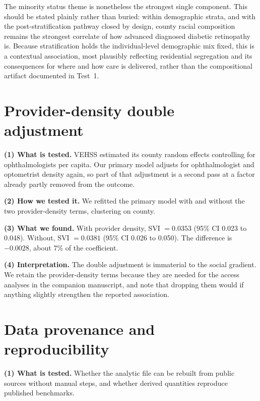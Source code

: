 \documentclass[11pt]{article}
\newcommand{\tpart}[1]{\medskip\noindent\textbf{#1}\quad}
\begin{document}
The minority status theme is nonetheless the strongest single component. This
should be stated plainly rather than buried: within demographic strata, and with
the post-stratification pathway closed by design, county racial composition
remains the strongest correlate of how advanced diagnosed diabetic retinopathy
is. Because stratification holds the individual-level demographic mix fixed,
this is a contextual association, most plausibly reflecting residential
segregation and its consequences for where and how care is delivered, rather
than the compositional artifact documented in Test~1.

\section{Provider-density double adjustment}

\tpart{(1) What is tested.} VEHSS estimated its county random effects
controlling for ophthalmologists per capita. Our primary model adjusts for
ophthalmologist and optometrist density again, so part of that adjustment is a
second pass at a factor already partly removed from the outcome.

\tpart{(2) How we tested it.} We refitted the primary model with and without the
two provider-density terms, clustering on county.

\tpart{(3) What we found.} With provider density, SVI $= 0.0353$ (95\% CI 0.023
to 0.048). Without, SVI $= 0.0381$ (95\% CI 0.026 to 0.050). The difference is
$-0.0028$, about 7\% of the coefficient.

\tpart{(4) Interpretation.} The double adjustment is immaterial to the social
gradient. We retain the provider-density terms because they are needed for the
access analyses in the companion manuscript, and note that dropping them would
if anything slightly strengthen the reported association.

\section{Data provenance and reproducibility}

\tpart{(1) What is tested.} Whether the analytic file can be rebuilt from public
sources without manual steps, and whether derived quantities reproduce published
benchmarks.
\end{document}
